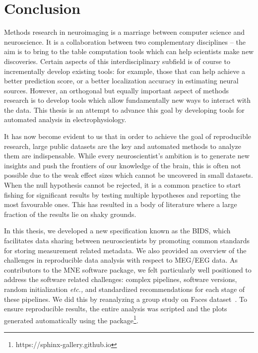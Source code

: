 \section*{Conclusion}

Methods research in neuroimaging is a marriage between computer science and neuroscience. It is a collaboration between two complementary disciplines -- the aim is to bring to the table computation tools which can help scientists make new discoveries. Certain aspects of this interdisciplinary subfield is of course to incrementally develop existing tools: for example, those that can help achieve a better prediction score, or a better localization accuracy in estimating neural sources. However, an orthogonal but equally important aspect of methods research is to develop tools which allow fundamentally new ways to interact with the data. This thesis is an attempt to advance this goal by developing tools for automated analysis in electrophysiology.

It has now become evident to us that in order to achieve the goal of reproducible research, large public datasets are the key and automated methods to analyze them are indispensable. While every neuroscientist's ambition is to generate new insights and push the frontiers of our knowledge of the brain, this is often not possible due to the weak effect sizes which cannot be uncovered in small datasets. When the null hypothesis cannot be rejected, it is a common practice to start fishing for significant results by testing multiple hypotheses and reporting the most favourable ones. This has resulted in a body of literature where a large fraction of the results lie on shaky grounds. 

In this thesis, we developed a new specification known as the \ac{BIDS}, which facilitates data sharing between neuroscientists by promoting common standards for storing measurement related metadata. We also provided an overview of the challenges in reproducible data analysis with respect to \ac{MEG}/\ac{EEG} data. As contributors to the MNE software package, we felt particularly well positioned to address  the software related challenges: complex pipelines, software versions, random initialization \emph{etc.,} and standardized recommendations for each stage of these pipelines. We did this by reanalyzing a group study on Faces dataset~\citep{wakeman2015multi}. To ensure reproducible results, the entire analysis was scripted and the plots generated automatically using the  package\footnote{https://sphinx-gallery.github.io}.

